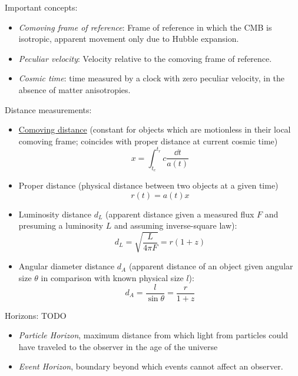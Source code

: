 			\noindent
			Important concepts:
			\begin{itemize}
				\item \emph{Comoving frame of reference}: Frame of reference in which the CMB is isotropic, apparent movement only due to Hubble expansion.
				\item \emph{Peculiar velocity}: Velocity relative to the comoving frame of reference.
				\item \emph{Cosmic time}: time measured by a clock with zero peculiar velocity, in the absence of matter anisotropies.
			\end{itemize}

			\noindent
			Distance measurements:
			\begin{itemize}
				\item \href{https://en.wikipedia.org/wiki/Comoving_and_proper_distances}{Comoving distance} (constant for objects which are motionless in their local comoving frame; coincides with proper distance at current cosmic time)
					\begin{equation}
						x = \int_{t_e}^{t_r} c\frac{\dd t}{a(t)}
					\end{equation}
				\item Proper distance (physical distance between two objects at a given time)
					\begin{equation}
						r(t) = a(t) x
					\end{equation}
				\item Luminosity distance $d_L$ (apparent distance given a measured flux $F$ and presuming a luminosity $L$ and assuming inverse-square law):
					\begin{equation}
						d_L = \sqrt{\frac{L}{4 \pi F}} = r (1+z)
					\end{equation}
				\item Angular diameter distance $d_A$ (apparent distance of an object given angular size $\theta$ in comparison with known physical size $l$):
					\begin{equation}
						d_A = \frac{l}{\sin \theta} = \frac{r}{1+z}
					\end{equation}
			\end{itemize}


			\noindent
			Horizons: TODO
			\begin{itemize}
				\item \emph{Particle Horizon}, maximum distance from which light from particles could have traveled to the observer in the age of the universe
				\item \emph{Event Horizon}, boundary beyond which events cannot affect an observer.
			\end{itemize}

